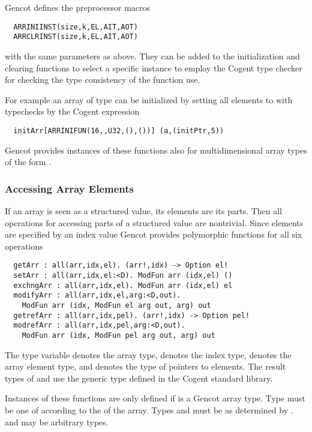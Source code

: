 Gencot defines the preprocessor macros
\begin{verbatim}
  ARRINIINST(size,k,EL,AIT,AOT)
  ARRCLRINST(size,k,EL,AIT,AOT)
\end{verbatim}
with the same parameters as above. They can be added to the initialization and clearing functions to select a specific instance
to employ the Cogent type checker for checking the type consistency of the function use.

For example an array  of type  can be initialized by setting all elements to  with typechecks by 
the Cogent expression
\begin{verbatim}
  initArr[ARRINIFUN(16,,U32,(),())] (a,(initPtr,5))
\end{verbatim}

Gencot provides instances of these functions also for multidimensional array types of the form .

\subsubsection{Accessing Array Elements}

If an array is seen as a structured value, its elements are its parts.
Then all operations for accessing parts of a structured value are nontrivial. Since elements are specified by an index value
Gencot provides polymorphic functions for all six operations
\begin{verbatim}
  getArr : all(arr,idx,el). (arr!,idx) -> Option el!
  setArr : all(arr,idx,el:<D). ModFun arr (idx,el) ()
  exchngArr : all(arr,idx,el). ModFun arr (idx,el) el
  modifyArr : all(arr,idx,el,arg:<D,out). 
    ModFun arr (idx, ModFun el arg out, arg) out
  getrefArr : all(arr,idx,pel). (arr!,idx) -> Option pel!
  modrefArr : all(arr,idx,pel,arg:<D,out). 
    ModFun arr (idx, ModFun pel arg out, arg) out
\end{verbatim}
The type variable  denotes the array type,  denotes the index type,
 denotes the array element type, and  denotes the type of pointers to elements. 
The result types of  and  use the generic type  defined in
the Cogent standard library.

Instances of these functions are only defined if  is a Gencot array type. Type 
must be one of  according to the  of the array. Types  and
 must be as determined by .  and  may be arbitrary types.

